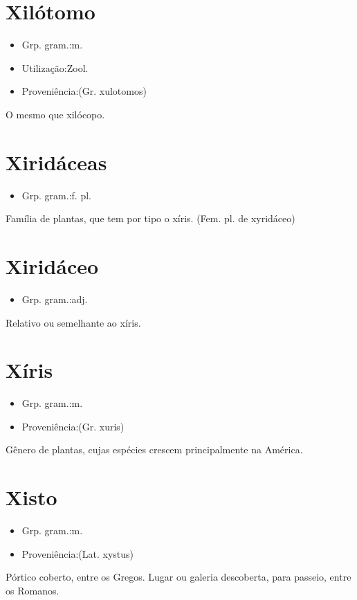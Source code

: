 \section{Xilótomo}
\begin{itemize}
\item {Grp. gram.:m.}
\end{itemize}
\begin{itemize}
\item {Utilização:Zool.}
\end{itemize}
\begin{itemize}
\item {Proveniência:(Gr. \textunderscore xulotomos\textunderscore )}
\end{itemize}
O mesmo que \textunderscore xilócopo\textunderscore .
\section{Xiridáceas}
\begin{itemize}
\item {Grp. gram.:f. pl.}
\end{itemize}
Família de plantas, que tem por tipo o xíris.
(Fem. pl. de \textunderscore xyridáceo\textunderscore )
\section{Xiridáceo}
\begin{itemize}
\item {Grp. gram.:adj.}
\end{itemize}
Relativo ou semelhante ao xíris.
\section{Xíris}
\begin{itemize}
\item {Grp. gram.:m.}
\end{itemize}
\begin{itemize}
\item {Proveniência:(Gr. \textunderscore xuris\textunderscore )}
\end{itemize}
Gênero de plantas, cujas espécies crescem principalmente na América.
\section{Xisto}
\begin{itemize}
\item {Grp. gram.:m.}
\end{itemize}
\begin{itemize}
\item {Proveniência:(Lat. \textunderscore xystus\textunderscore )}
\end{itemize}
Pórtico coberto, entre os Gregos.
Lugar ou galeria descoberta, para passeio, entre os Romanos.
